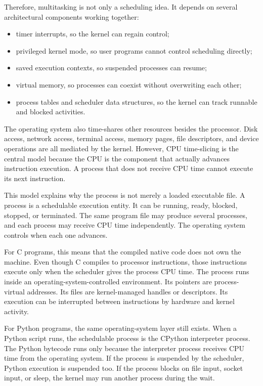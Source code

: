 Therefore, multitasking is not only a scheduling idea. It depends on several architectural components working together:

\begin{itemize}
    \item timer interrupts, so the kernel can regain control;
    \item privileged kernel mode, so user programs cannot control scheduling directly;
    \item saved execution contexts, so suspended processes can resume;
    \item virtual memory, so processes can coexist without overwriting each other;
    \item process tables and scheduler data structures, so the kernel can track runnable and blocked activities.
\end{itemize}

The operating system also time-shares other resources besides the processor. Disk access, network access, terminal access, memory pages, file descriptors, and device operations are all mediated by the kernel. However, CPU time-slicing is the central model because the CPU is the component that actually advances instruction execution. A process that does not receive CPU time cannot execute its next instruction.

This model explains why the process is not merely a loaded executable file. A process is a schedulable execution entity. It can be running, ready, blocked, stopped, or terminated. The same program file may produce several processes, and each process may receive CPU time independently. The operating system controls when each one advances.

For C programs, this means that the compiled native code does not own the machine. Even though C compiles to processor instructions, those instructions execute only when the scheduler gives the process CPU time. The process runs inside an operating-system-controlled environment. Its pointers are process-virtual addresses. Its files are kernel-managed handles or descriptors. Its execution can be interrupted between instructions by hardware and kernel activity.

For Python programs, the same operating-system layer still exists. When a Python script runs, the schedulable process is the CPython interpreter process. The Python bytecode runs only because the interpreter process receives CPU time from the operating system. If the process is suspended by the scheduler, Python execution is suspended too. If the process blocks on file input, socket input, or sleep, the kernel may run another process during the wait.

